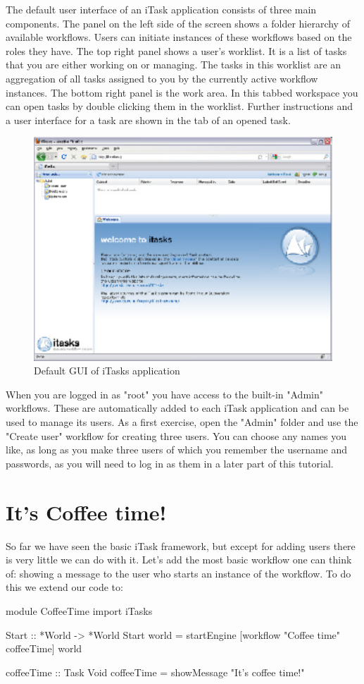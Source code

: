 \documentclass[a4paper,11pt]{article}
\begin{document}
The default user interface of an iTask application consists of three main components. The panel on the left side of the screen shows a folder hierarchy of available workflows. Users can initiate instances of these workflows based on the roles they have. The top right panel shows a user's worklist. It is a list of tasks that you are either working on or managing. The tasks in this worklist are an aggregation of all tasks assigned to you by the currently active workflow instances. The bottom right panel is the work area. In this tabbed workspace you can open tasks by double clicking them in the worklist. Further instructions and a user interface for a task are shown in the tab of an opened task.
\begin{figure}[h]
\centerline{\includegraphics[width=12cm]{GettingStarted-img/empty-browser.eps}}
\caption{Default GUI of iTasks application} \label{empty-browser}
\end{figure}

When you are logged in as "root" you have access to the built-in "Admin" workflows. These are automatically added to each iTask application and can be used to manage its users. As a first exercise, open the "Admin" folder and use the "Create user" workflow for creating three users. You can choose any names you like, as long as you make three users of which you remember the username and passwords, as you will need to log in as them in a later part of this tutorial.

\section{It's Coffee time!}
So far we have seen the basic iTask framework, but except for adding users there is very little we can do with it. Let's add the most basic workflow one can think of: showing a message to the user who starts an instance of the workflow.
To do this we extend our code to:
\begin{CleanCode}
module CoffeeTime
import iTasks

Start :: *World -> *World
Start world = startEngine [workflow "Coffee time" coffeeTime] world

coffeeTime :: Task Void
coffeeTime = showMessage "It's coffee time!"
\end{CleanCode}
\end{document}
